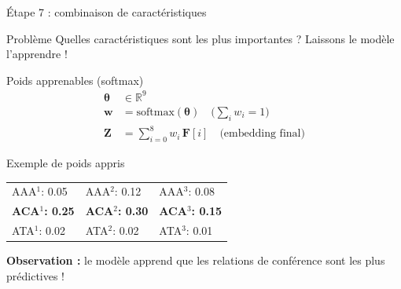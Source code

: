 \documentclass[9pt,aspectratio=169,professionalfonts]{beamer}
\begin{document}
\begin{frame}{Étape 7 : combinaison de caractéristiques}
\begin{alertblock}{Problème}
Quelles caractéristiques sont les plus importantes ? Laissons le modèle l'apprendre !
\end{alertblock}

\begin{block}{Poids apprenables (softmax)}
\begin{align}
\boldsymbol{\theta} &\in \mathbb R^9\\
\mathbf w &= \text{softmax}(\boldsymbol{\theta}) \quad \bigl(\sum_i w_i = 1\bigr)\\[4pt]
\mathbf Z &= \sum_{i=0}^{8} w_i\,\mathbf F[i] \quad \text{(embedding final)}
\end{align}
\end{block}

\begin{exampleblock}{Exemple de poids appris}
\begin{center}
\begin{tabular}{lll}
\toprule
AAA$^1$: 0.05 & AAA$^2$: 0.12 & AAA$^3$: 0.08 \\
\textbf{ACA$^1$: 0.25} & \textbf{ACA$^2$: 0.30} & \textbf{ACA$^3$: 0.15} \\
ATA$^1$: 0.02 & ATA$^2$: 0.02 & ATA$^3$: 0.01 \\
\bottomrule
\end{tabular}
\end{center}
\textbf{Observation :} le modèle apprend que les relations de conférence sont les plus prédictives !
\end{exampleblock}
\end{frame}
\end{document}
